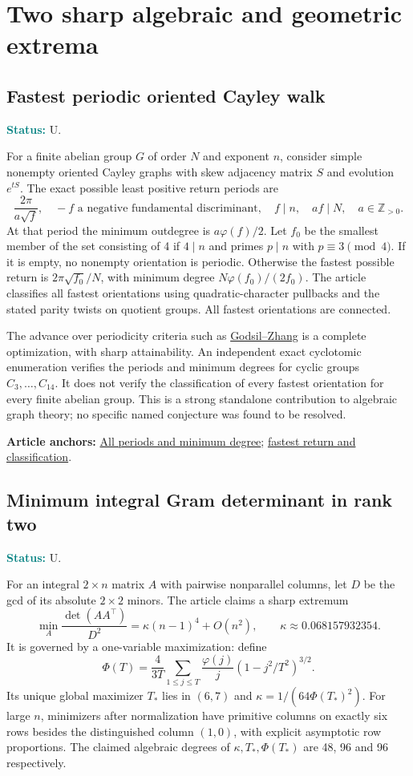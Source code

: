 \documentclass[11pt]{article}
\newcommand{\art}[3]{\href{https://github.com/VladimirReshetnikov/ProveIt/blob/3c4d27a69c98d09319a51e41a19fca05bb80a3e2/Analysis/GeneralizedRiemannHypothesis/Article/sections/#1.tex\#L#2}{#3}}
\newcommand{\status}[1]{\par\smallskip\noindent\textcolor{teal}{\textbf{Status:}} #1\par\smallskip}
\newcommand{\sources}[1]{\par\smallskip\noindent\textbf{Article anchors:} #1\par}
\newcommand{\Z}{\mathbb Z}
\begin{document}
\section{Two sharp algebraic and geometric extrema}
\subsection{Fastest periodic oriented Cayley walk}
\status{U.}
For a finite abelian group $G$ of order $N$ and exponent $n$, consider simple nonempty oriented Cayley graphs with skew adjacency matrix $S$ and evolution $e^{tS}$. The exact possible least positive return periods are
\[
 \frac{2\pi}{a\sqrt f},\quad -f\text{ a negative fundamental discriminant},\quad
 f\mid n,\quad a f\mid N,\quad a\in\Z_{>0}.
\]
At that period the minimum outdegree is $a\varphi(f)/2$. Let $f_0$ be the smallest member of the set consisting of 4 if $4\mid n$ and primes $p\mid n$ with $p\equiv3\pmod4$. If it is empty, no nonempty orientation is periodic. Otherwise the fastest possible return is $2\pi\sqrt{f_0}/N$, with minimum degree $N\varphi(f_0)/(2f_0)$. The article classifies all fastest orientations using quadratic-character pullbacks and the stated parity twists on quotient groups. All fastest orientations are connected.

The advance over periodicity criteria such as \href{https://arxiv.org/abs/2405.14140}{Godsil--Zhang} is a complete optimization, with sharp attainability. An independent exact cyclotomic enumeration verifies the periods and minimum degrees for cyclic groups $C_3,\ldots,C_{14}$. It does not verify the classification of every fastest orientation for every finite abelian group. This is a strong standalone contribution to algebraic graph theory; no specific named conjecture was found to be resolved.
\sources{\art{gra}{3048}{All periods and minimum degree}; \art{gra}{3061}{fastest return and classification}.}

\subsection{Minimum integral Gram determinant in rank two}
\status{U.}
For an integral $2\times n$ matrix $A$ with pairwise nonparallel columns, let $D$ be the gcd of its absolute $2\times2$ minors. The article claims a sharp extremum
\[
 \min_A \frac{\det(AA^\top)}{D^2}=\kappa(n-1)^4+O(n^2),\qquad
 \kappa\approx0.068157932354.
\]
It is governed by a one-variable maximization: define
\[
 \Phi(T)=\frac4{3T}\sum_{1\le j\le T}\frac{\varphi(j)}j(1-j^2/T^2)^{3/2}.
\]
Its unique global maximizer $T_*$ lies in $(6,7)$ and $\kappa=1/(64\Phi(T_*)^2)$. For large $n$, minimizers after normalization have primitive columns on exactly six rows besides the distinguished column $(1,0)$, with explicit asymptotic row proportions. The claimed algebraic degrees of $\kappa,T_*,\Phi(T_*)$ are 48, 96 and 96 respectively.
\end{document}
